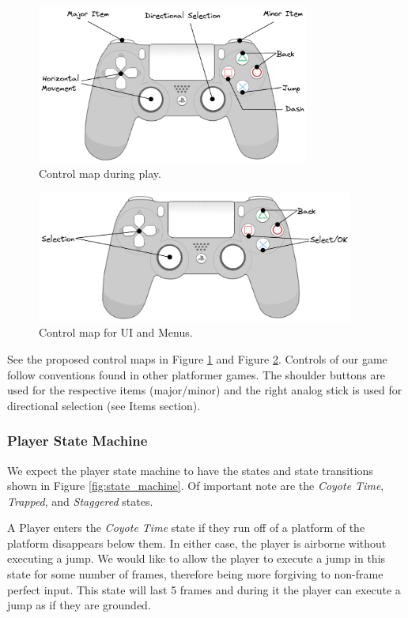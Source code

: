 \begin{figure}
    \centering
    \includegraphics[width=0.8\textwidth]{figures/game_controls.png}
    \caption{Control map during play.}
    \label{fig:game_controls}
\end{figure}

\begin{figure}
    \centering
    \includegraphics[width=0.93\textwidth]{figures/menu_controls.png}
    \caption{Control map for UI and Menus.}
    \label{fig:menu_controls}
\end{figure}

See the proposed control maps in Figure \ref{fig:game_controls} and Figure \ref{fig:menu_controls}.
Controls of our game follow conventions found in other platformer games. The shoulder buttons are used for the respective items (major/minor) and the right analog stick is used for directional selection (see Items section). 

\subsubsection{Player State Machine}

We expect the player state machine to have the states and state transitions shown in Figure \ref{fig:state_machine}. Of important note are the \emph{Coyote Time}, \emph{Trapped}, and \emph{Staggered} states.

A Player enters the \emph{Coyote Time} state if they run off of a platform of the platform disappears below them. In either case, the player is airborne without executing a jump. We would like to allow the player to execute a jump in this state for some number of frames, therefore being more forgiving to non-frame perfect input. This state will last 5 frames and during it the player can execute a jump as if they are grounded.

